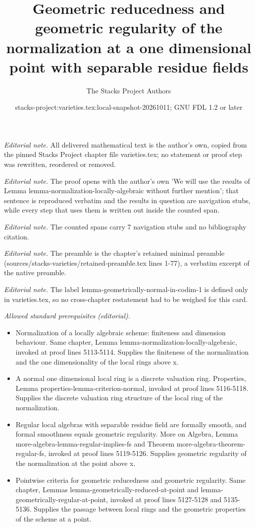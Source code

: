\documentclass[10pt,a4paper]{amsart}
\title{Geometric reducedness and geometric regularity of the normalization at a one dimensional point with separable residue fields}
\author{The Stacks Project Authors}
\date{stacks-project:varieties.tex:local-snapshot-20261011; GNU FDL 1.2 or later}
\theoremstyle{plain}
\theoremstyle{definition}
\theoremstyle{remark}
\numberwithin{equation}{subsection}
\begin{document}
\maketitle
\noindent\textit{Editorial note.} All delivered mathematical text is the author's own, copied from the pinned Stacks Project chapter file varieties.tex; no statement or proof step was rewritten, reordered or removed.\par\medskip
\noindent\textit{Editorial note.} The proof opens with the author's own 'We will use the results of Lemma lemma-normalization-locally-algebraic without further mention'; that sentence is reproduced verbatim and the results in question are navigation stubs, while every step that uses them is written out inside the counted span.\par\medskip
\noindent\textit{Editorial note.} The counted spans carry 7 navigation stubs and no bibliography citation.\par\medskip
\noindent\textit{Editorial note.} The preamble is the chapter's retained minimal preamble (sources/stacks-varieties/retained-preamble.tex lines 1-77), a verbatim excerpt of the native preamble.\par\medskip
\noindent\textit{Editorial note.} The label lemma-geometrically-normal-in-codim-1 is defined only in varieties.tex, so no cross-chapter restatement had to be weighed for this card.\par\medskip
\noindent\textit{Allowed standard prerequisites (editorial).}\begin{itemize}
\item Normalization of a locally algebraic scheme: finiteness and dimension behaviour. Same chapter, Lemma lemma-normalization-locally-algebraic, invoked at proof lines 5113-5114. Supplies the finiteness of the normalization and the one dimensionality of the local rings above x.
\item A normal one dimensional local ring is a discrete valuation ring. Properties, Lemma properties-lemma-criterion-normal, invoked at proof lines 5116-5118. Supplies the discrete valuation ring structure of the local ring of the normalization.
\item Regular local algebras with separable residue field are formally smooth, and formal smoothness equals geometric regularity. More on Algebra, Lemma more-algebra-lemma-regular-implies-fs and Theorem more-algebra-theorem-regular-fs, invoked at proof lines 5119-5126. Supplies geometric regularity of the normalization at the point above x.
\item Pointwise criteria for geometric reducedness and geometric regularity. Same chapter, Lemmas lemma-geometrically-reduced-at-point and lemma-geometrically-regular-at-point, invoked at proof lines 5127-5128 and 5135-5136. Supplies the passage between local rings and the geometric properties of the scheme at a point.
\end{itemize}\medskip
\end{document}
